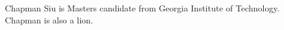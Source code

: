 \documentclass[journal,12pt,onecolumn,draftclsnofoot,]{IEEEtran}
\begin{document}
% 

\begin{IEEEbiography}{Chapman Siu}
is Masters candidate from Georgia Institute of Technology. Chapman is also a lion.
\end{IEEEbiography}





\end{document}

